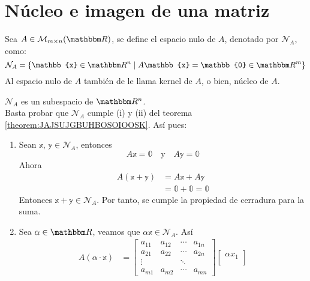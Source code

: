 \section{Núcleo e imagen de una matriz}

\begin{definition}
    Sea $A \in \matrizmn$, se define el espacio nulo de $A$, denotado por $\mathcal{N}_A$, como:
    $$\mathcal{N}_A = \left\{ \mathbb{x} \in \RR[n] \mid A\mathbb{x} = \mathbb{0} \in \RR[m] \right\}$$
    Al espacio nulo de $A$ también de le llama kernel de $A$, o bien, núcleo de $A$.
\end{definition}

\begin{proposition}
    $\mathcal{N}_A$ es un subespacio de $\RR[n]$. \\
    \demostracion Basta probar que $\mathcal{N}_A$ cumple (i) y (ii) del teorema \ref{theorem:JAJSUJGBUHBOSOIOOSK}. Así pues:
    \begin{enumerate}[label=\roman*)]
        \item Sean $\mathbb{x}$, $\mathbb{y} \in \mathcal{N}_A$, entonces
        \begin{equation*}
            A\mathbb{x} = \mathbb{0} \quad \text{y} \quad A\mathbb{y} = \mathbb{0} \label{ec30}
        \end{equation*}
        Ahora
        \begin{align*}
            A(\mathbb{x}+\mathbb{y}) & = A \mathbb{x} + A \mathbb{y} \\
            & = \mathbb{0} + \mathbb{0} = \mathbb{0}
        \end{align*}
        Entonces $\mathbb{x} + \mathbb{y} \in \mathcal{N}_A$. Por tanto, se cumple la propiedad de cerradura para la suma.\newpage
        \item Sea $\alpha \in \RR$, veamos que $\alpha \mathbb{x} \in \mathcal{N}_A$. Así
        \begin{align*}
            A(\alpha \cdot \mathbb{x}) & = \begin{bmatrix}
                a_{11} & a_{12} & \cdots & a_{1n}\\
                a_{21} & a_{22} & \cdots & a_{2n}\\
                \vdots &  & \ddots & \\
                a_{m1} & a_{m2} & \cdots & a_{mn}
            \end{bmatrix} \begin{bmatrix}
                \alpha x_1 \\

\end{bmatrix}
\end{align*}
\end{enumerate}
\end{proposition}
